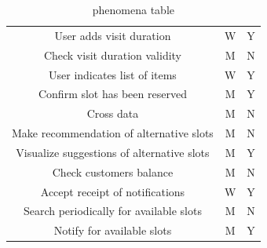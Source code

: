 \documentclass[table, 12pt]{article}
\begin{document}
\begin{center}
\begin{table}
\begin{tabular}{|c|c|c|}
            User adds visit duration                   & W                & Y          \\
            Check visit duration validity              & M                & N          \\
            User indicates list of items               & W                & Y          \\
            Confirm slot has been reserved             & M                & Y          \\
            Cross data                                 & M                & N          \\
            Make recommendation of alternative slots   & M                & N          \\
            Visualize suggestions of alternative slots & M                & Y          \\
            Check customers balance                    & M                & N          \\
            Accept receipt of notifications            & W                & Y          \\
            Search periodically for available slots    & M                & N          \\
            Notify for available slots                 & M                & Y          \\

            \hline
        \end{tabular}
        \caption{phenomena table}
    \end{table}
\end{center}
\newpage
\end{document}
